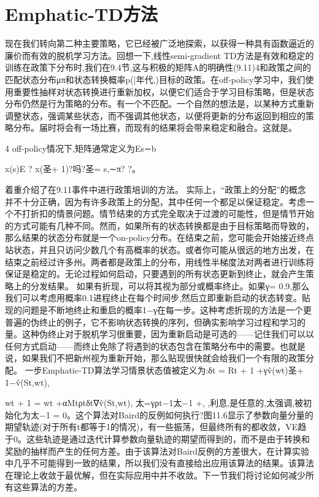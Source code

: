 \section{Emphatic-TD方法}

现在我们转向第二种主要策略，它已经被广泛地探索，以获得一种具有函数逼近的廉价而有效的脱机学习方法。回想一下,线性semi-gradient TD方法是有效和稳定的训练在政策下分布时,我们在9.4节,这与积极的矩阵A的明确性(9.11)4和政策之间的匹配状态分布μπ和状态转换概率p(|年代,)目标的政策。在off-policy学习中，我们使用重要性抽样对状态转换进行重新加权，以便它们适合于学习目标策略，但是状态分布仍然是行为策略的分布。有一个不匹配。一个自然的想法是，以某种方式重新调整状态，强调某些状态，而不强调其他状态，以便将更新的分布返回到相应的策略分布。届时将会有一场比赛，而现有的结果将会带来稳定和融合。这就是。

4 off-policy情况下,矩阵通常定义为Es∼b

x(s)E ? x(圣+ 1)?吗?圣= s,∼π? ?。

着重介绍了在9.11事件中进行政策培训的方法。
实际上，“政策上的分配”的概念并不十分正确，因为有许多政策上的分配，其中任何一个都足以保证稳定。考虑一个不打折扣的情景问题。情节结束的方式完全取决于过渡的可能性，但是情节开始的方式可能有几种不同。然而，如果所有的状态转换都是由于目标策略而导致的，那么结果的状态分布就是一个on-policy分布。在结束之前，您可能会开始接近终点站状态，并且只访问少数几个有高概率的状态。或者你可能从很远的地方出发，在结束之前经过许多州。两者都是政策上的分布，用线性半梯度法对两者进行训练将保证是稳定的。无论过程如何启动，只要遇到的所有状态更新到终止，就会产生策略上的分发结果。
如果有折现，可以将其视为部分或概率终止。如果γ= 0.9,那么我们可以考虑用概率0.1进程终止在每个时间步,然后立即重新启动的状态转变。贴现的问题是不断地终止和重启的概率1−γ在每一步。这种考虑折现的方法是一个更普遍的伪终止的例子，它不影响状态转换的序列，但确实影响学习过程和学习的量。这种伪终止对于脱机学习很重要，因为重新启动是可选的——记住我们可以以任何方式启动——而终止免除了将遇到的状态包含在策略分布中的需要。也就是说，如果我们不把新州视为重新开始，那么贴现很快就会给我们一个有限的政策分配。
一步Emphatic-TD算法学习情景状态值被定义为:δt = Rt + 1 +γv̂(wt)圣+ 1−v̂(St,wt),

wt + 1 = wt +αMtρtδt∇v̂(St,wt),
太=γρt−1太−1 +,
,利息,是任意的,太强调,被初始化为太−1 = 0。这个算法对Baird的反例如何执行?图11.6显示了参数向量分量的期望轨迹(对于所有t都等于1的情况)，有一些振荡，但最终所有的都收敛，VE趋于0。这些轨迹是通过迭代计算参数向量轨迹的期望而得到的，而不是由于转换和奖励的抽样而产生的任何方差。由于该算法对Baird反例的方差很大，在计算实验中几乎不可能得到一致的结果，所以我们没有直接给出应用该算法的结果。该算法在理论上收敛于最优解，但在实际应用中并不收敛。下一节我们将讨论如何减少所有这些算法的方差。

